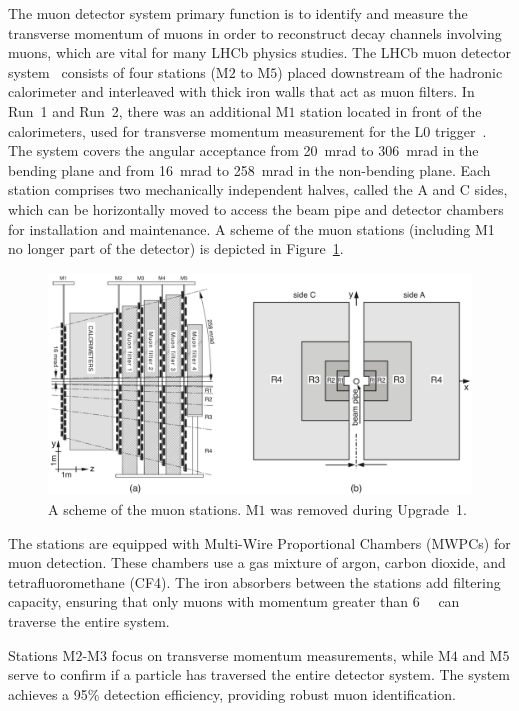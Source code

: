 The muon detector system primary function is to identify and measure the transverse momentum of muons in order to reconstruct decay channels involving muons, which are vital for many LHCb physics studies.
The LHCb muon detector system~\cite{Alves_2013} consists of four stations (M$2$ to M$5$) placed downstream of the hadronic calorimeter and interleaved with thick iron walls that act as muon filters. In Run~1 and Run~2, there was an additional M$1$ station located in front of the calorimeters, used for transverse momentum measurement for the L$0$ trigger~\cite{muon_upgrade}. The system covers the angular acceptance from \SI{20}{\milli\radian} to \SI{306}{\milli\radian} in the bending plane and from \SI{16}{\milli\radian} to \SI{258}{\milli\radian} in the non-bending plane. Each station comprises two mechanically independent halves, called the A and C sides, which can be horizontally moved to access the beam pipe and detector chambers for installation and maintenance.
A scheme of the muon stations (including M1 no longer part of the detector) is depicted in Figure~\ref{fig:muon}.
\begin{figure}
    \centering
    \includegraphics[width=\textwidth]{figures/muon.png}
    \caption{A scheme of the muon stations. M$1$ was removed during Upgrade~1.}
    \label{fig:muon}
\end{figure}
The stations are equipped with Multi-Wire Proportional Chambers (MWPCs) for muon detection. These chambers use a gas mixture of argon, carbon dioxide, and tetrafluoromethane (CF4). The iron absorbers between the stations add filtering capacity, ensuring that only muons with momentum greater than \SI[per-mode=symbol]{6}{\giga\eVperc} can traverse the entire system.

Stations M$2$-M$3$ focus on transverse momentum measurements, while M$4$ and M$5$ serve to confirm if a particle has traversed the entire detector system. The system achieves a 95\% detection efficiency, providing robust muon identification. 


